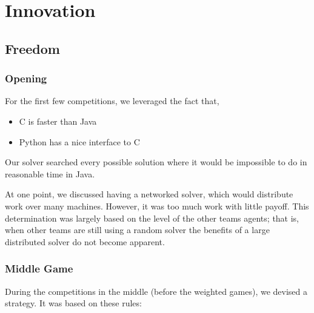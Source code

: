 \documentclass[letterpaper,12pt,oneside]{article}
\begin{document}
\section{Innovation}

\setcounter{subsection}{-1}
\setcounter{subsubsection}{-1}
\subsection{Freedom}

\subsubsection{Opening}
For the first few competitions, we leveraged the fact that,
\begin{itemize}
\item C is faster than Java
\item Python has a nice interface to C
\end{itemize}
Our solver searched every possible solution where it would be impossible to
do in reasonable time in Java.

At one point, we discussed having a networked solver, which would
distribute work over many machines. However, it was too much work with
little payoff. This determination was largely based on the level of the other
teams agents; that is, when other teams are still using a random solver the
benefits of a large distributed solver do not become apparent.

\subsubsection{Middle Game} \label{Middle Game}

During the competitions in the middle (before the weighted games), we
devised a strategy. It was based on these rules: \\ \\
\end{document}

